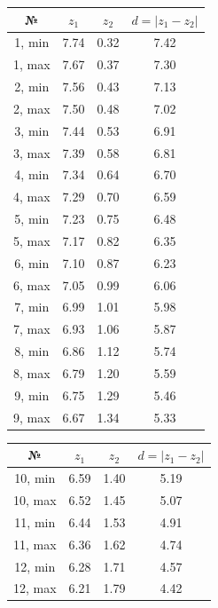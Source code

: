 \documentclass[a4paper,12pt]{article} %
\begin{document}
\begin{enumerate}
\begin{table}[h]
    \centering
    \begin{tabular}{|c|c|c|c|}
        \hline
        № & {$z_1$} & {$z_2$} & {$d=|z_1-z_2|$} \\  \hline
         \hline
        1, min  & 7.74 & 0.32 & 7.42 \\ \hline
        1, max  & 7.67 & 0.37 & 7.30 \\ \hline
        2, min  & 7.56 & 0.43 & 7.13 \\ \hline
        2, max  & 7.50 & 0.48 & 7.02 \\ \hline
        3, min  & 7.44 & 0.53 & 6.91 \\ \hline
        3, max  & 7.39 & 0.58 & 6.81 \\ \hline
        4, min  & 7.34 & 0.64 & 6.70 \\ \hline
        4, max  & 7.29 & 0.70 & 6.59 \\ \hline
        5, min  & 7.23 & 0.75 & 6.48 \\ \hline
        5, max  & 7.17 & 0.82 & 6.35 \\ \hline
        6, min  & 7.10 & 0.87 & 6.23 \\ \hline
        6, max  & 7.05 & 0.99 & 6.06 \\ \hline
        7, min  & 6.99 & 1.01 & 5.98 \\ \hline
        7, max  & 6.93 & 1.06 & 5.87 \\ \hline
        8, min  & 6.86 & 1.12 & 5.74 \\ \hline
        8, max  & 6.79 & 1.20 & 5.59 \\ \hline
        9, min  & 6.75 & 1.29 & 5.46 \\ \hline
        9, max  & 6.67 & 1.34 & 5.33 \\ \hline
    \end{tabular}
    \begin{tabular}{|c|c|c|c|}
        \hline
        № & {$z_1$} & {$z_2$} & {$d=|z_1-z_2|$} \\ \hline
        \hline
        10, min & 6.59 & 1.40 & 5.19 \\ \hline
        10, max & 6.52 & 1.45 & 5.07 \\ \hline
        11, min & 6.44 & 1.53 & 4.91 \\ \hline
        11, max & 6.36 & 1.62 & 4.74 \\ \hline
        12, min & 6.28 & 1.71 & 4.57 \\ \hline
        12, max & 6.21 & 1.79 & 4.42 \\ \hline

\end{tabular}
\end{table}
\end{enumerate}
\end{document}
